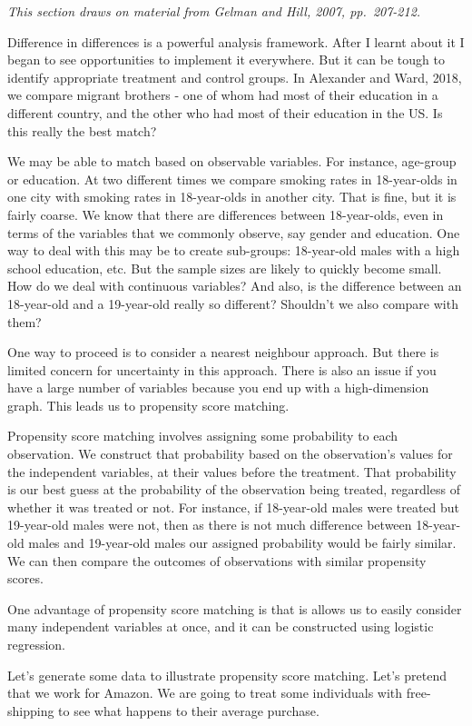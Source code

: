 \documentclass[
]{book}
\begin{document}
\emph{This section draws on material from Gelman and Hill, 2007, pp.~207-212.}

Difference in differences is a powerful analysis framework. After I learnt about it I began to see opportunities to implement it everywhere. But it can be tough to identify appropriate treatment and control groups. In Alexander and Ward, 2018, we compare migrant brothers - one of whom had most of their education in a different country, and the other who had most of their education in the US. Is this really the best match?

We may be able to match based on observable variables. For instance, age-group or education. At two different times we compare smoking rates in 18-year-olds in one city with smoking rates in 18-year-olds in another city. That is fine, but it is fairly coarse. We know that there are differences between 18-year-olds, even in terms of the variables that we commonly observe, say gender and education. One way to deal with this may be to create sub-groups: 18-year-old males with a high school education, etc. But the sample sizes are likely to quickly become small. How do we deal with continuous variables? And also, is the difference between an 18-year-old and a 19-year-old really so different? Shouldn't we also compare with them?

One way to proceed is to consider a nearest neighbour approach. But there is limited concern for uncertainty in this approach. There is also an issue if you have a large number of variables because you end up with a high-dimension graph. This leads us to propensity score matching.

Propensity score matching involves assigning some probability to each observation. We construct that probability based on the observation's values for the independent variables, at their values before the treatment. That probability is our best guess at the probability of the observation being treated, regardless of whether it was treated or not. For instance, if 18-year-old males were treated but 19-year-old males were not, then as there is not much difference between 18-year-old males and 19-year-old males our assigned probability would be fairly similar. We can then compare the outcomes of observations with similar propensity scores.

One advantage of propensity score matching is that is allows us to easily consider many independent variables at once, and it can be constructed using logistic regression.

Let's generate some data to illustrate propensity score matching. Let's pretend that we work for Amazon. We are going to treat some individuals with free-shipping to see what happens to their average purchase.
\end{document}
